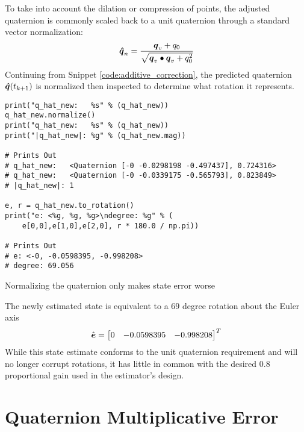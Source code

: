 To take into account the dilation or compression of points, the adjusted quaternion is commonly scaled back to a unit quaternion through a standard vector normalization:
\begin{equation}
  \boldsymbol{\hat{q}}_n = \frac{\boldsymbol{q}_v + q_0}{\sqrt{\boldsymbol{q}_v \bullet \boldsymbol{q}_v + q_0^2}}
  \label{eqn:NormalizeQuaternion}
\end{equation}
Continuing from Snippet \ref{code:additive_correction}, the predicted quaternion $\boldsymbol{\hat{q}}(t_{k+1})$ is normalized then inspected to determine what rotation it represents.
\begin{listing}
\begin{singlespace}
  \begin{verbatim}
print("q_hat_new:   %s" % (q_hat_new))
q_hat_new.normalize()
print("q_hat_new:   %s" % (q_hat_new))
print("|q_hat_new|: %g" % (q_hat_new.mag))

# Prints Out
# q_hat_new:   <Quaternion [-0 -0.0298198 -0.497437], 0.724316>
# q_hat_new:   <Quaternion [-0 -0.0339175 -0.565793], 0.823849>
# |q_hat_new|: 1

e, r = q_hat_new.to_rotation()
print("e: <%g, %g, %g>\ndegree: %g" % (
    e[0,0],e[1,0],e[2,0], r * 180.0 / np.pi))

# Prints Out
# e: <-0, -0.0598395, -0.998208>
# degree: 69.056
  \end{verbatim}
\caption{Normalizing the quaternion only makes state error worse}
\label{code:normalized_no_work}
\nocite{minted}
\end{singlespace}
\end{listing}

The newly estimated state is equivalent to a $69$ degree rotation about the Euler axis
\begin{equation}
  \hat{\boldsymbol{e}} = \begin{bmatrix} 0 & -0.0598395 & -0.998208 \end{bmatrix}^T
\end{equation}
While this state estimate conforms to the unit quaternion requirement and will no longer corrupt rotations, it has little in common with the desired $0.8$ proportional gain used in the estimator's design.



\section{Quaternion Multiplicative Error}
\label{sec:QuaternionMultiplicativeError}

